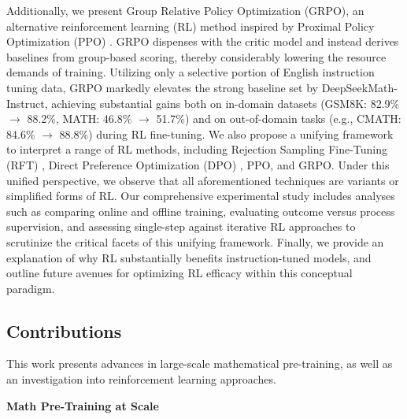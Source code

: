 Additionally, we present Group Relative Policy Optimization (GRPO), an alternative reinforcement learning (RL) method inspired by Proximal Policy Optimization (PPO) \citep{schulman2017proximal}. GRPO dispenses with the critic model and instead derives baselines from group-based scoring, thereby considerably lowering the resource demands of training. Utilizing only a selective portion of English instruction tuning data, GRPO markedly elevates the strong baseline set by DeepSeekMath-Instruct, achieving substantial gains both on in-domain datasets (GSM8K: 82.9\% $\rightarrow$ 88.2\%, MATH: 46.8\% $\rightarrow$ 51.7\%) and on out-of-domain tasks (e.g., CMATH: 84.6\% $\rightarrow$ 88.8\%) during RL fine-tuning. We also propose a unifying framework to interpret a range of RL methods, including Rejection Sampling Fine-Tuning (RFT) \citep{yuan2023scaling}, Direct Preference Optimization (DPO) \citep{dpo}, PPO, and GRPO. Under this unified perspective, we observe that all aforementioned techniques are variants or simplified forms of RL. Our comprehensive experimental study includes analyses such as comparing online and offline training, evaluating outcome versus process supervision, and assessing single-step against iterative RL approaches to scrutinize the critical facets of this unifying framework. Finally, we provide an explanation of why RL substantially benefits instruction-tuned models, and outline future avenues for optimizing RL efficacy within this conceptual paradigm.

\subsection{Contributions}
This work presents advances in large-scale mathematical pre-training, as well as an investigation into reinforcement learning approaches.

\textbf{Math Pre-Training at Scale}

